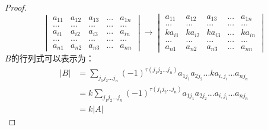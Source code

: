 \documentclass[blue,normal,cn]{elegantnote}
\begin{document}
\begin{proof}
    $$
        \begin{vmatrix} 
            a_{11}&a_{12} & a_{13} &...& a_{1n}\\
            ...&...&...&...&...\\
            a_{i1}&a_{i2} & a_{i3} &...& a_{in}\\
            ...&...&...&...&...\\
            a_{n1}&a_{n2} & a_{n3} &...& a_{nn}
        \end{vmatrix}
        \longrightarrow
        \begin{vmatrix} 
            a_{11}&a_{12} & a_{13} &...& a_{1n}\\
            ...&...&...&...&...\\
            ka_{i1}& ka_{i2} & ka_{i3} &...& ka_{in}\\
            ...&...&...&...&...\\
            a_{n1}&a_{n2} & a_{n3} &...& a_{nn}
        \end{vmatrix}
    $$
$B$的行列式可以表示为：
$$
    \begin{aligned}
        |B|&=\sum_{j_1j_2...j_n}(-1)^{\tau(j_1 j_2...j_n)}a_{1 j_1}a_{2 j_2}...ka_{i,j_i}...a_{n j_n}\\
           &=k\sum_{j_1j_2...j_n}(-1)^{\tau(j_1 j_2...j_n)}a_{1 j_1}a_{2 j_2}...a_{i,j_i}...a_{n j_n}\\
           &=k|A|
    \end{aligned}
$$
\end{proof}
\end{document}
